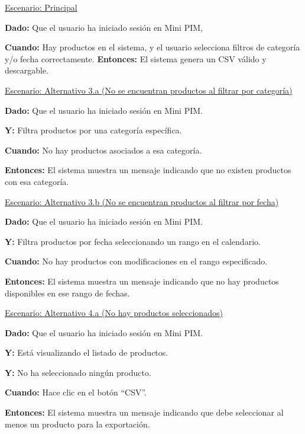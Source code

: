 
\underline{Escenario: Principal}\par
\textbf{Dado:} Que el usuario ha iniciado sesión en Mini PIM, \par
\textbf{Cuando:} Hay productos en el sistema, y el usuario selecciona filtros de categoría y/o fecha correctamente.
\textbf{Entonces:} El sistema genera un CSV válido y descargable.\par
\vspace{0.15cm}
\underline{Escenario: Alternativo 3.a (No se encuentran productos al filtrar por categoría)}\par
\textbf{Dado:} Que el usuario ha iniciado sesión en Mini PIM.  \par
\textbf{Y:} Filtra productos por una categoría específica. \par 
\textbf{Cuando:} No hay productos asociados a esa categoría. \par 
\textbf{Entonces:} El sistema muestra un mensaje indicando que no existen productos con esa categoría.\par
\vspace{0.15cm}
\underline{Escenario: Alternativo 3.b (No se encuentran productos al filtrar por fecha)}\par
\textbf{Dado:} Que el usuario ha iniciado sesión en Mini PIM.  \par
\textbf{Y:} Filtra productos por fecha seleccionando un rango en el calendario.\par  
\textbf{Cuando:} No hay productos con modificaciones en el rango especificado.  \par
\textbf{Entonces:} El sistema muestra un mensaje indicando que no hay productos disponibles en ese rango de fechas.\par
\vspace{0.15cm}
\underline{Escenario: Alternativo 4.a (No hay productos seleccionados)}\par
\textbf{Dado:} Que el usuario ha iniciado sesión en Mini PIM.  \par
\textbf{Y:} Está visualizando el listado de productos.  \par
\textbf{Y:} No ha seleccionado ningún producto.  \par
\textbf{Cuando:} Hace clic en el botón \enquote{CSV}.  \par
\textbf{Entonces:} El sistema muestra un mensaje indicando que debe seleccionar al menos un producto para la exportación.\par
\vspace{0.15cm}
